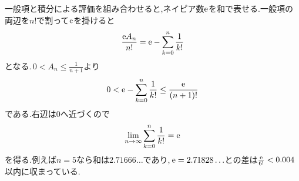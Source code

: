 一般項と積分による評価を組み合わせると,ネイピア数$\mathrm{e}$を和で表せる.一般項の両辺を$n!$で割って$\mathrm{e}$を掛けると
\[
 \frac{\mathrm{e} A_n}{n!}=\mathrm{e}-\sum_{k=0}^{n}\frac1{k!}
\]
となる.\,$0<A_n\le\frac1{n+1}$より
\[
 0<\mathrm{e}-\sum_{k=0}^{n}\frac1{k!}\le\frac{\mathrm{e}}{(n+1)!}
\]
である.右辺は$0$へ近づくので
\[
 \lim_{n\to\infty}\sum_{k=0}^{n}\frac1{k!}=\mathrm{e}
\]
を得る.例えば$n=5$なら和は$2.71666\ldots$であり,\,$\mathrm{e}=2.71828\ldots$との差は$\frac{\mathrm{e}}{6!}<0.004$以内に収まっている.
